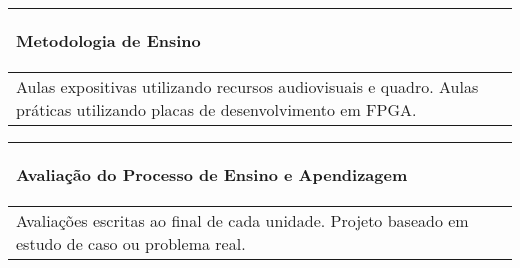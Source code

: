 \begin{table}[h]
\centering
\begin{small} 
\setlength{\tabcolsep}{3pt} 
\begin{tabular}{|p{15cm}|}\hline

\begin{center}\textbf{Metodologia de Ensino}\end{center}\\ \hline
   Aulas expositivas utilizando recursos audiovisuais e quadro. Aulas práticas utilizando placas de desenvolvimento em FPGA.
 \\ \hline
\end{tabular} 
\end{small}
\label{dadosinstituicao}
\end{table}


\begin{table}[h]
\centering
\begin{small} 
\setlength{\tabcolsep}{3pt} 
\begin{tabular}{|p{15cm}|}\hline

\begin{center}\textbf{Avaliação do Processo de Ensino e Apendizagem}\end{center}\\ \hline
   Avaliações escritas ao final de cada unidade. Projeto baseado em estudo de caso ou problema real.
 \\ \hline

\end{tabular} 
\end{small}
\label{dadosinstituicao}
\end{table}

